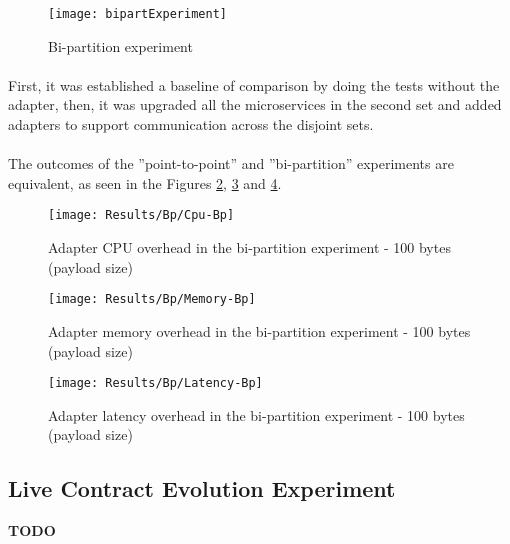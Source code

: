\begin{figure}[htbp]
    \centering
    \centerline{\texttt{[image: bipartExperiment]}}
    \caption{Bi-partition experiment}
    \label{fig:biPart}
\end{figure}

\paragraph{}

First, it was established a baseline of comparison by doing the tests without the adapter,
then, it was upgraded all the microservices in the second set and added adapters to support communication across the disjoint sets.

\paragraph{}

The outcomes of the ''point-to-point'' and ''bi-partition'' experiments are equivalent, as seen in the Figures \ref{fig:biPartCPU}, \ref{fig:biPartMem} and \ref{fig:biPartLatency}.

\begin{figure}[htbp]
    \centering
    \centerline{\texttt{[image: Results/Bp/Cpu-Bp]}}
    \caption{Adapter CPU overhead in the bi-partition experiment - 100 bytes (payload size)}
    \label{fig:biPartCPU}
\end{figure}

\begin{figure}[htbp]
    \centering
    \centerline{\texttt{[image: Results/Bp/Memory-Bp]}}
    \caption{Adapter memory overhead in the bi-partition experiment - 100 bytes (payload size)}
    \label{fig:biPartMem}
\end{figure}

\begin{figure}[htbp]
    \centering
    \centerline{\texttt{[image: Results/Bp/Latency-Bp]}}
    \caption{Adapter latency overhead in the bi-partition experiment - 100 bytes (payload size)}
    \label{fig:biPartLatency}
\end{figure}

\subsection{Live Contract Evolution Experiment}

\textbf{TODO}